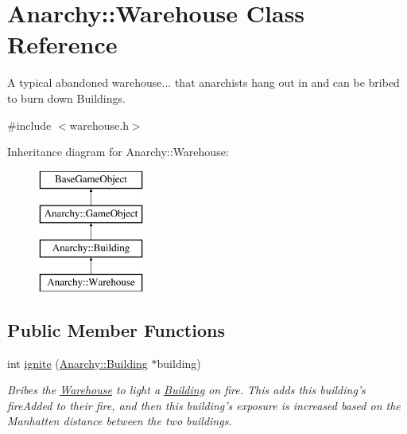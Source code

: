 \hypertarget{classAnarchy_1_1Warehouse}{\section{Anarchy\-:\-:Warehouse Class Reference}
\label{classAnarchy_1_1Warehouse}
}


A typical abandoned warehouse... that anarchists hang out in and can be bribed to burn down Buildings.  




{\ttfamily \#include $<$warehouse.\-h$>$}

Inheritance diagram for Anarchy\-:\-:Warehouse\-:\begin{figure}[H]
\begin{center}
\leavevmode
\includegraphics[height=4.000000cm]{classAnarchy_1_1Warehouse}
\end{center}
\end{figure}
\subsection*{Public Member Functions}
\begin{DoxyCompactItemize}
\item 
int \hyperlink{classAnarchy_1_1Warehouse_a8f6b4bb3e14832987703652dde82d6b7}{ignite} (\hyperlink{classAnarchy_1_1Building}{Anarchy\-::\-Building} $\ast$building)
\begin{DoxyCompactList}\small\item\em Bribes the \hyperlink{classAnarchy_1_1Warehouse}{Warehouse} to light a \hyperlink{classAnarchy_1_1Building}{Building} on fire. This adds this building's fire\-Added to their fire, and then this building's exposure is increased based on the Manhatten distance between the two buildings. \end{DoxyCompactList}\end{DoxyCompactItemize}
